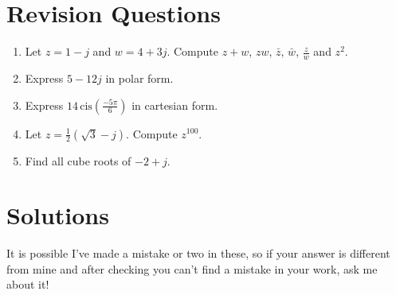 \documentclass{article}
\newcommand{\cis}{\,\mathrm{cis}}
\begin{document}
\clearpage

\section{Revision Questions}

\begin{enumerate}
\item Let $z=1-j$ and $w=4+3j$. Compute $z+w$, $zw$, $\bar{z}$, $\bar{w}$, $\frac{z}{w}$ and $z^2$.
\item Express $5-12j$ in polar form.
\item Express $14\cis\left(\frac{-5\pi}{6}\right)$ in cartesian form.
\item Let $z=\frac{1}{2}(\sqrt{3}-j)$. Compute $z^{100}$.
\item Find all cube roots of $-2+j$.
\end{enumerate}




\clearpage

\section{Solutions}

It is possible I've made a mistake or two in these, so if your answer is different from mine and after checking you can't find a mistake in your work, ask me about it!
\end{document}
